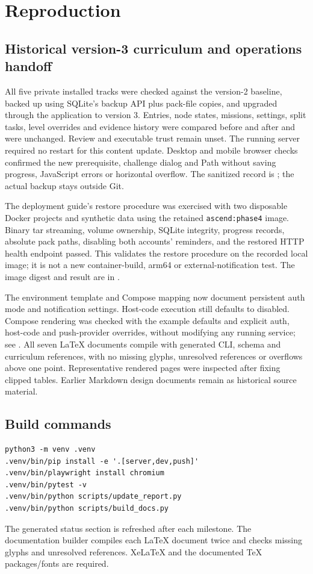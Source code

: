 \documentclass[11pt,a4paper]{article}
\begin{document}
\section{Reproduction}
\subsection{Historical version-3 curriculum and operations handoff}
All five private installed tracks were checked against the version-2 baseline,
backed up using SQLite's backup API plus pack-file copies, and upgraded through
the application to version 3. Entries, node states, missions, settings, split
tasks, level overrides and evidence history were compared before and after and
were unchanged. Review and executable trust remain unset. The running server
required no restart for this content update. Desktop and mobile browser checks
confirmed the new prerequisite, challenge dialog and Path without saving progress,
JavaScript errors or horizontal overflow. The sanitized record is
; the actual backup stays outside Git.

The deployment guide's restore procedure was exercised with two disposable Docker
projects and synthetic data using the retained \texttt{ascend:phase4} image.
Binary tar streaming, volume ownership, SQLite integrity, progress records,
absolute pack paths, disabling both accounts' reminders, and the restored HTTP
health endpoint passed. This validates the restore procedure on the recorded
local image; it is not a new container-build, arm64 or external-notification test.
The image digest and result are in .

The environment template and Compose mapping now document persistent auth mode
and notification settings. Host-code execution still defaults to disabled.
Compose rendering was checked with the example defaults and explicit auth,
host-code and push-provider overrides, without modifying any running service;
see .
All seven LaTeX documents compile with generated CLI, schema and curriculum
references, with no missing glyphs, unresolved references or overflows above
one point. Representative rendered pages were inspected after fixing clipped
tables. Earlier Markdown design documents remain as historical source material.

\subsection{Build commands}
\begin{verbatim}
python3 -m venv .venv
.venv/bin/pip install -e '.[server,dev,push]'
.venv/bin/playwright install chromium
.venv/bin/pytest -v
.venv/bin/python scripts/update_report.py
.venv/bin/python scripts/build_docs.py
\end{verbatim}
The generated status section is refreshed after each milestone. The documentation builder compiles each LaTeX document twice and checks missing glyphs and unresolved references. XeLaTeX and the documented TeX packages/fonts are required.
\end{document}
